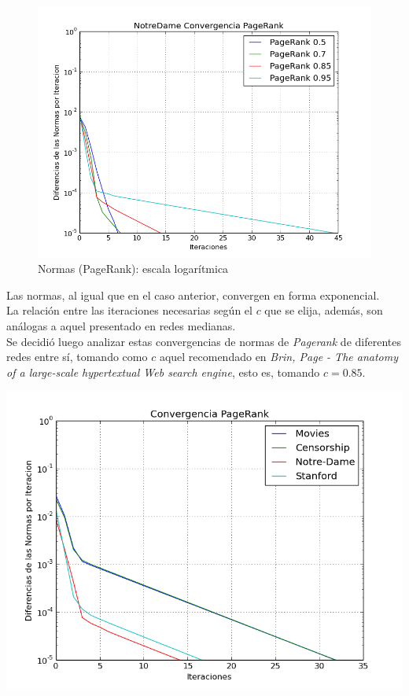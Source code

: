 \documentclass[a4paper]{article}
\begin{document}
\begin{figure}[ht]
\centering
\includegraphics[scale=0.4]{img/Normas-Page-Notre.png}
\caption{Normas (PageRank): escala logarítmica}
\end{figure}

Las normas, al igual que en el caso anterior, convergen en forma exponencial.\\
La relación entre las iteraciones necesarias según el $c$ que se elija, además, son análogas a aquel presentado en redes medianas.\\


Se decidió luego analizar estas convergencias de normas de \textit{Pagerank} de diferentes redes entre sí, tomando como $c$ aquel recomendado en \textit{Brin, Page - The anatomy of a large-scale hypertextual Web search engine}, esto es, tomando $c=0.85$.\\

\begin{center}
\includegraphics[scale=0.4]{img/Convergencia-PageRank.png}
\end{center}
\end{document}
